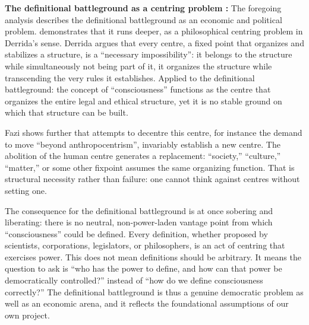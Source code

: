 \documentclass[acmlarge, nonacm]{acmart}
\begin{document}
\textbf{The definitional battleground as a centring problem \cite{fazi2026}:} The foregoing analysis describes the definitional battleground as an economic and political problem. \citet{fazi2026} demonstrates that it runs deeper, as a philosophical centring problem in Derrida's sense. Derrida argues that every centre, a fixed point that organizes and stabilizes a structure, is a ``necessary impossibility'': it belongs to the structure while simultaneously not being part of it, it organizes the structure while transcending the very rules it establishes. Applied to the definitional battleground: the concept of ``consciousness'' functions as the centre that organizes the entire legal and ethical structure, yet it is no stable ground on which that structure can be built.

Fazi shows further that attempts to decentre this centre, for instance the demand to move ``beyond anthropocentrism'', invariably establish a new centre. The abolition of the human centre generates a replacement: ``society,'' ``culture,'' ``matter,'' or some other fixpoint assumes the same organizing function. That is structural necessity rather than failure: one cannot think against centres without setting one.

The consequence for the definitional battleground is at once sobering and liberating: there is no neutral, non-power-laden vantage point from which ``consciousness'' could be defined. Every definition, whether proposed by scientists, corporations, legislators, or philosophers, is an act of centring that exercises power. This does not mean definitions should be arbitrary. It means the question to ask is ``who has the power to define, and how can that power be democratically controlled?'' instead of ``how do we define consciousness correctly?'' The definitional battleground is thus a genuine democratic problem as well as an economic arena, and it reflects the foundational assumptions of our own project.
\end{document}
